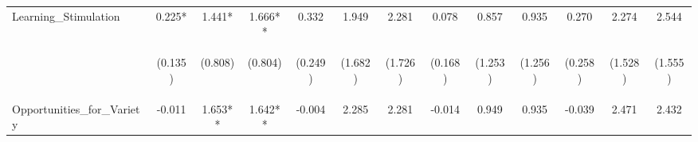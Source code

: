 \begin{tabular}{lcccccccccccc}
\noalign{\smallskip}Learning_Stimulation & 0.225* & 1.441* & 1.666** & 0.332 & 1.949 & 2.281 & 0.078 & 0.857 & 0.935 & 0.270 & 2.274 & 2.544\\
 & \begin{footnotesize}(0.135)\end{footnotesize} & \begin{footnotesize}(0.808)\end{footnotesize} & \begin{footnotesize}(0.804)\end{footnotesize} & \begin{footnotesize}(0.249)\end{footnotesize} & \begin{footnotesize}(1.682)\end{footnotesize} & \begin{footnotesize}(1.726)\end{footnotesize} & \begin{footnotesize}(0.168)\end{footnotesize} & \begin{footnotesize}(1.253)\end{footnotesize} & \begin{footnotesize}(1.256)\end{footnotesize} & \begin{footnotesize}(0.258)\end{footnotesize} & \begin{footnotesize}(1.528)\end{footnotesize} & \begin{footnotesize}(1.555)\end{footnotesize}\\
\noalign{\smallskip}Opportunities_for_Variety & -0.011 & 1.653** & 1.642** & -0.004 & 2.285 & 2.281 & -0.014 & 0.949 & 0.935 & -0.039 & 2.471 & 2.432\\

\end{tabular}
